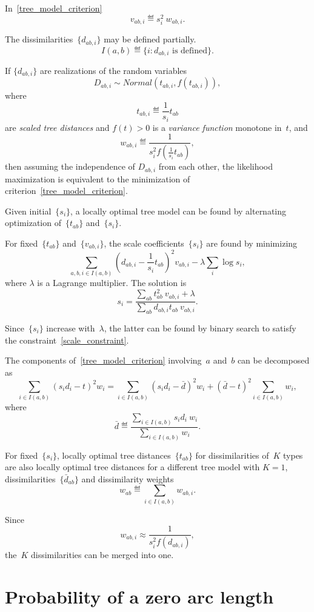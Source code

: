 \documentclass[10pt,a4paper]{article}
\theoremstyle{plain} \newtheorem{Lem}{Lemma}
\begin{document}
  In~\ref{tree_model_criterion}
  $$ v_{ab,i} \eqdef s_i^2 \ w_{ab,i}. $$

  The dissimilarities~$\{d_{ab,i}\}$  may be defined partially.
  $$ I(a,b) \eqdef \{i:d_{ab,i} \textrm{ is defined}\}. $$

  If $\{d_{ab,i}\}$ are realizations of the random variables
  $$ D_{ab,i} \sim Normal (t_{ab,i}, f(t_{ab,i})), $$
  where
  $$ t_{ab,i} \eqdef \frac 1 {s_i} t_{ab} $$
  are {\em scaled tree distances}
  and $f(t) > 0$  is a {\em variance function} monotone in~$t$,
  and
  $$ w_{ab,i} \eqdef \frac 1 {s_i^2 f\left(\frac 1 {s_i} t_{ab}\right)}, $$
  then assuming the independence of $D_{ab,i}$ from each other,
  the likelihood maximization is equivalent to the minimization of criterion~\ref{tree_model_criterion}.

  Given initial~$\{s_i\}$, a locally optimal tree model can be found by alternating optimization of~$\{t_{ab}\}$ and~$\{s_i\}$.

  For fixed~$\{t_{ab}\}$ and~$\{v_{ab,i}\}$, the scale coefficients~$\{s_i\}$ are found by minimizing
  $$ \sum_{a,b,i \in I(a,b)} \left(d_{ab,i} - \frac 1 {s_i} t_{ab}\right)^2 v_{ab,i} - \lambda \sum_i \log s_i, $$
  where $\lambda$ is a Lagrange multiplier.
  The solution is
  $$ s_i = \frac {\sum_{ab} t_{ab}^2 \ v_{ab,i} + \lambda} {\sum_{ab} d_{ab,i} t_{ab} \ v_{ab,i}} . $$

  Since~$\{s_i\}$ increase with~$\lambda$,
  the latter can be found by binary search to satisfy the constraint~\ref{scale_constraint}.

  The components of~\ref{tree_model_criterion} involving~$a$ and~$b$ can be decomposed as
  $$ \sum_{i \in I(a,b)} \left(s_i d_i - t\right)^2 w_i
  = \sum_{i \in I(a,b)} \left(s_i d_i - \bar d \right)^2 w_i + (\bar d - t)^2 \sum_{i \in I(a,b)} w_i,
  $$
  where
  $$ \bar d \eqdef \frac {\sum_{i \in I(a,b)} s_i d_i \ w_i} {\sum_{i \in I(a,b)} w_i}. $$

  For fixed~$\{s_i\}$, locally optimal tree distances~$\{t_{ab}\}$ for dissimilarities of~$K$ types
  are also locally optimal tree distances for a different tree model with $K=1$, dissimilarities~$\{\bar d_{ab}\}$
  and dissimilarity weights
  $$ w_{ab} \eqdef \sum_{i \in I(a,b)} w_{ab,i}. $$

  Since
  $$ w_{ab,i} \approx \frac 1 {s_i^2 f(d_{ab,i})}, $$
  the~$K$ dissimilarities can be merged into one.


\section{Probability of a zero arc length}
\end{document}
